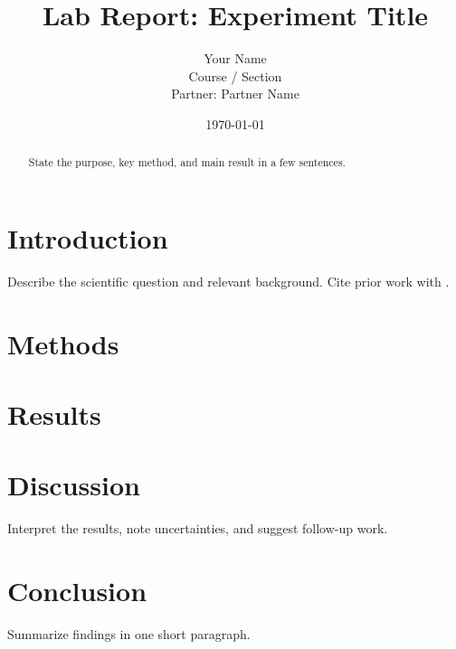 \documentclass[11pt]{article}
\title{Lab Report: Experiment Title}
\author{Your Name \\ Course / Section \\ Partner: Partner Name}
\date{\today}
\begin{document}
\maketitle

\begin{abstract}
State the purpose, key method, and main result in a few sentences.
\end{abstract}

\section{Introduction}
Describe the scientific question and relevant background. Cite prior work
with \citep{example2024}.

\section{Methods}


\section{Results}


\section{Discussion}
Interpret the results, note uncertainties, and suggest follow-up work.

\section{Conclusion}
Summarize findings in one short paragraph.



\end{document}
